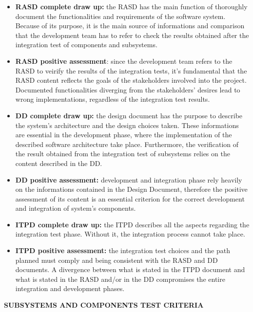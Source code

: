 \begin{itemize}
	\item \textbf{RASD complete draw up:} the RASD has the main function of thoroughly document the functionalities and requirements of the software system. Because of its purpose, it is the main source of informations and comparison that the development team has to refer to check the results obtained after the integration test of components and subsystems.

	\item \textbf{RASD positive assessment}: since the development team refers to the RASD to veirify the results of the integration tests, it's fundamental that the RASD content reflects the goals of the stakeholders involved into the project. Documented functionalities diverging from the stakeholders' desires lead to wrong implementations, regardless of the integration test results.

	\item \textbf{DD complete draw up:} the design document has the purpose to describe the system's architecture and the design choices taken. These informations are essential in the development phase, where the implementation of the described software architecture take place. Furthermore, the verification of the result obtained from the integration test of subsystems relies on the content described in the DD.

	\item \textbf{DD positive assessment:} development and integration phase rely heavily on the informations contained in the Design Document, therefore the positive assessment of its content is an essential criterion for the correct development and integration of system's components.

	\item \textbf{ITPD complete draw up:} the ITPD describes all the aspects regarding the integration test phase. Without it, the integration process cannot take place.

	\item \textbf{ITPD positive assessment:} the integration test choices and the path planned must comply and being consistent with the RASD and DD documents. A divergence between what is stated in the ITPD document and what is stated in the RASD and/or in the DD compromises the entire integration and development phases.

\end{itemize}

\textbf{SUBSYSTEMS AND COMPONENTS TEST CRITERIA}

